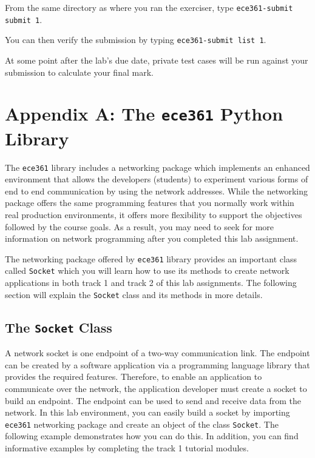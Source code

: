 \documentclass[11pt]{article}
\def\thelab{1}
\begin{document}
From the same directory as where you ran the exerciser, type \texttt{ece361-submit submit \thelab}.

You can then verify the submission by typing \texttt{ece361-submit list \thelab}.

At some point after the lab's due date, private test cases will be run against your submission to calculate your final mark.


\newpage
\section{Appendix A: The \texttt{ece361} Python Library}
\label{sec:appendix-ece361-lib}
The \texttt{ece361} library includes a networking package which implements an enhanced environment that allows the developers (students) to experiment various forms of end to end communication by using the network addresses. While the networking package offers the same programming features that you normally work within real production environments, it offers more flexibility to support the objectives followed by the course goals. As a result, you may need to seek for more information on network programming after you completed this lab assignment.

The networking package offered by \texttt{ece361} library provides an important class called \texttt{Socket} which you will learn how to use its methods to create network applications in both track 1 and track 2 of this lab assignments. The following section will explain the \texttt{Socket} class and its methods in more details.

\subsection{The \texttt{Socket} Class}
\label{subsec:socket-class}
A network socket is one endpoint of a two-way communication link. The endpoint can be created by a software application via a programming language library that provides the required features.
Therefore, to enable an application to communicate over the network, the application developer must create a socket to build an endpoint.
The endpoint can be used to send and receive data from the network. In this lab environment, you can easily build a socket by importing \texttt{ece361} networking package and create an object of the class \texttt{Socket}.
The following example demonstrates how you can do this. In addition, you can find informative examples by completing the track 1 tutorial modules.
\end{document}
